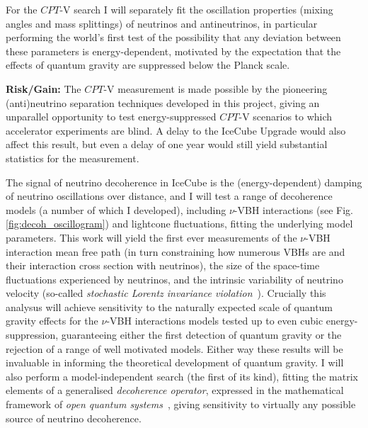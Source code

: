 \documentclass[a4paper,11pt]{article}
\begin{document}
For the $CPT$-V search I will separately fit the oscillation properties (mixing angles and mass splittings) of neutrinos and antineutrinos, in particular performing the world's first test of the possibility that any deviation between these parameters is energy-dependent, motivated by the expectation that the effects of quantum gravity are suppressed below the Planck scale.

\textbf{Risk/Gain:} The $CPT$-V measurement is made possible by the pioneering (anti)neutrino separation techniques developed in this project, giving an unparallel opportunity to test energy-suppressed $CPT$-V scenarios to which accelerator experiments are blind. A delay to the IceCube Upgrade would also affect this result, but even a delay of one year would still yield substantial statistics for the measurement.

The signal of neutrino decoherence in IceCube is the (energy-dependent) damping of neutrino oscillations over distance, and I will test a range of decoherence models (a number of which I developed), including $\nu$-VBH interactions (see Fig. \ref{fig:decoh_oscillogram}) and lightcone fluctuations, fitting the underlying model parameters. This work will yield the first ever measurements of the $\nu$-VBH interaction mean free path (in turn constraining how numerous VBHs are and their interaction cross section with neutrinos), the size of the space-time fluctuations experienced by neutrinos, and the intrinsic variability of neutrino velocity (so-called \textit{stochastic Lorentz invariance violation}~\cite{Vasileiou2015, Amelino-Camelia:2016fuh}). Crucially this analysus will achieve sensitivity to the naturally expected scale of quantum gravity effects for the $\nu$-VBH interactions models tested up to even cubic energy-suppression, guaranteeing either the first detection of quantum gravity or the rejection of a range of well motivated models. Either way these results will be invaluable in informing the theoretical development of quantum gravity. I will also perform a model-independent search (the first of its kind), fitting the matrix elements of a generalised \textit{decoherence operator}, expressed in the mathematical framework of \textit{open quantum systems}~\cite{lindblad1976, Benatti_2000, gago2002study, PhysRevLett.85.1166}, giving sensitivity to virtually any possible source of neutrino decoherence. 

\end{document}
